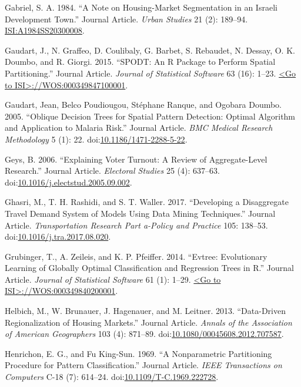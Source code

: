 \documentclass[]{elsarticle} %
\begin{document}
\hypertarget{ref-Gabriel1984}{}
Gabriel, S. A. 1984. ``A Note on Housing-Market Segmentation in an
Israeli Development Town.'' Journal Article. \emph{Urban Studies} 21
(2): 189--94. \url{ISI:A1984SS20300008}.

\hypertarget{ref-Gaudart2015}{}
Gaudart, J., N. Graffeo, D. Coulibaly, G. Barbet, S. Rebaudet, N.
Dessay, O. K. Doumbo, and R. Giorgi. 2015. ``SPODT: An R Package to
Perform Spatial Partitioning.'' Journal Article. \emph{Journal of
Statistical Software} 63 (16): 1--23.
\href{\%3CGo\%20to\%20ISI\%3E://WOS:000349847100001}{\textless{}Go to ISI\textgreater{}://WOS:000349847100001}.

\hypertarget{ref-Gaudart2005}{}
Gaudart, Jean, Belco Poudiougou, Stéphane Ranque, and Ogobara Doumbo.
2005. ``Oblique Decision Trees for Spatial Pattern Detection: Optimal
Algorithm and Application to Malaria Risk.'' Journal Article. \emph{BMC
Medical Research Methodology} 5 (1): 22.
doi:\href{https://doi.org/10.1186/1471-2288-5-22}{10.1186/1471-2288-5-22}.

\hypertarget{ref-Geys2006}{}
Geys, B. 2006. ``Explaining Voter Turnout: A Review of Aggregate-Level
Research.'' Journal Article. \emph{Electoral Studies} 25 (4): 637--63.
doi:\href{https://doi.org/10.1016/j.electstud.2005.09.002}{10.1016/j.electstud.2005.09.002}.

\hypertarget{ref-Ghasri2017}{}
Ghasri, M., T. H. Rashidi, and S. T. Waller. 2017. ``Developing a
Disaggregate Travel Demand System of Models Using Data Mining
Techniques.'' Journal Article. \emph{Transportation Research Part
a-Policy and Practice} 105: 138--53.
doi:\href{https://doi.org/10.1016/j.tra.2017.08.020}{10.1016/j.tra.2017.08.020}.

\hypertarget{ref-Grubinger2014}{}
Grubinger, T., A. Zeileis, and K. P. Pfeiffer. 2014. ``Evtree:
Evolutionary Learning of Globally Optimal Classification and Regression
Trees in R.'' Journal Article. \emph{Journal of Statistical Software} 61
(1): 1--29.
\href{\%3CGo\%20to\%20ISI\%3E://WOS:000349840200001}{\textless{}Go to ISI\textgreater{}://WOS:000349840200001}.

\hypertarget{ref-Helbich2013}{}
Helbich, M., W. Brunauer, J. Hagenauer, and M. Leitner. 2013.
``Data-Driven Regionalization of Housing Markets.'' Journal Article.
\emph{Annals of the Association of American Geographers} 103 (4):
871--89.
doi:\href{https://doi.org/10.1080/00045608.2012.707587}{10.1080/00045608.2012.707587}.

\hypertarget{ref-Henrichon1969}{}
Henrichon, E. G., and Fu King-Sun. 1969. ``A Nonparametric Partitioning
Procedure for Pattern Classification.'' Journal Article. \emph{IEEE
Transactions on Computers} C-18 (7): 614--24.
doi:\href{https://doi.org/10.1109/T-C.1969.222728}{10.1109/T-C.1969.222728}.
\end{document}
